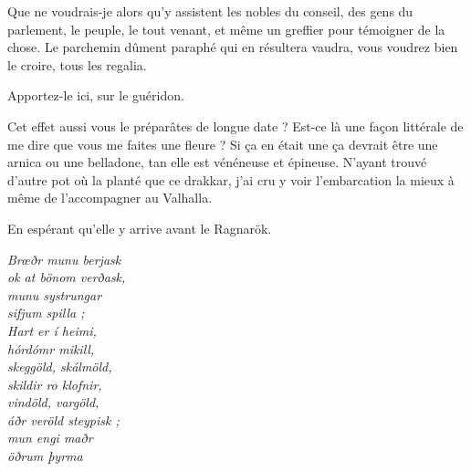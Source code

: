 \begin{drama}
  Que ne voudrais-je alors qu’y assistent les nobles du conseil, des gens du parlement, le peuple, le tout venant, et même un greffier pour témoigner de la chose. Le parchemin dûment paraphé qui en résultera vaudra, vous voudrez bien le croire, tous les regalia.

  \elenaspeaks {} Apportez-le ici, sur le guéridon.


  \reinespeaks Cet effet aussi vous le préparâtes de longue date ? Est-ce là une façon littérale de me dire que vous me faites une fleure ? %
  \elenaspeaks Si ça en était une ça devrait être une arnica ou une belladone, tan elle est  vénéneuse et épineuse. N’ayant trouvé d’autre pot où la planté que ce drakkar, j’ai cru y voir l’embarcation la mieux à même de l’accompagner au Valhalla.


  En espérant qu’elle y arrive avant le Ragnarök.



  \choirspeaks
  \begin{minipage}[t]{\linewidth}
    \em
    Brœðr munu berjask\endnote{\ragnarokendnote}\\
    ok at bönom verðask,\\
    munu systrungar\\
    sifjum spilla ;\\
    Hart er í heimi,\\
    hórdómr mikill,\\
    skeggöld, skálmöld,\\
    skildir ro klofnir,\\
    vindöld, vargöld,\\
    áðr veröld steypisk ;\\
    mun engi maðr\\
    öðrum þyrma
  \end{minipage}
\end{drama}

\scene

\StageDirII{\elena, \ela}


